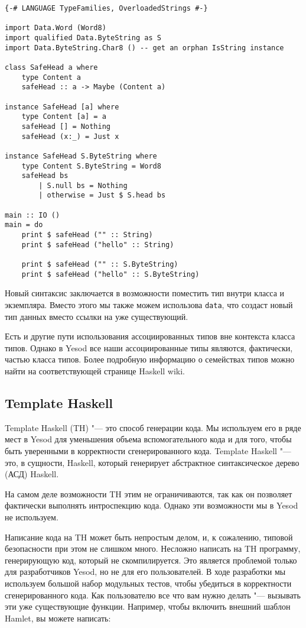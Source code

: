 \begin{lstlisting}
{-# LANGUAGE TypeFamilies, OverloadedStrings #-}

import Data.Word (Word8)
import qualified Data.ByteString as S
import Data.ByteString.Char8 () -- get an orphan IsString instance

class SafeHead a where
    type Content a
    safeHead :: a -> Maybe (Content a)

instance SafeHead [a] where
    type Content [a] = a
    safeHead [] = Nothing
    safeHead (x:_) = Just x

instance SafeHead S.ByteString where
    type Content S.ByteString = Word8
    safeHead bs
        | S.null bs = Nothing
        | otherwise = Just $ S.head bs

main :: IO ()
main = do
    print $ safeHead ("" :: String)
    print $ safeHead ("hello" :: String)

    print $ safeHead ("" :: S.ByteString)
    print $ safeHead ("hello" :: S.ByteString)
\end{lstlisting}

Новый синтаксис заключается в возможности поместить тип внутри класса и экземпляра. Вместо этого мы также можем использова \lstinline'data', что создаст новый тип данных вместо ссылки на уже существующий.

Есть и другие пути использования ассоциированных типов вне контекста класса типов. Однако в Yesod все наши ассоциированные типы являются, фактически, частью класса типов. Более подробную информацию о семействах типов можно найти на соответствующей странице Haskell wiki.

\subsection{Template Haskell}

Template Haskell (TH) "--- это способ генерации кода. Мы используем его в ряде мест в Yesod для уменьшения объема вспомогательного кода и для того, чтобы быть уверенными в корректности сгенерированного кода. Template Haskell "--- это, в сущности, Haskell, который генерирует абстрактное синтаксическое дерево (АСД) Haskell.

На самом деле возможности TH этим не ограничиваются, так как он позволяет фактически выполнять интроспекцию кода. Однако эти возможности мы в Yesod не используем.

Написание кода на TH может быть непростым делом, и, к сожалению, типовой безопасности при этом не слишком много. Несложно написать на TH программу, генерирующую код, который не скомпилируется. Это является проблемой только для разработчиков Yesod, но не для его пользователей. В ходе разработки мы используем большой набор модульных тестов, чтобы убедиться в корректности сгенерированного кода. Как пользователю все что вам нужно делать "--- вызывать эти уже существующие функции. Например, чтобы включить внешний шаблон Hamlet, вы можете написать:

